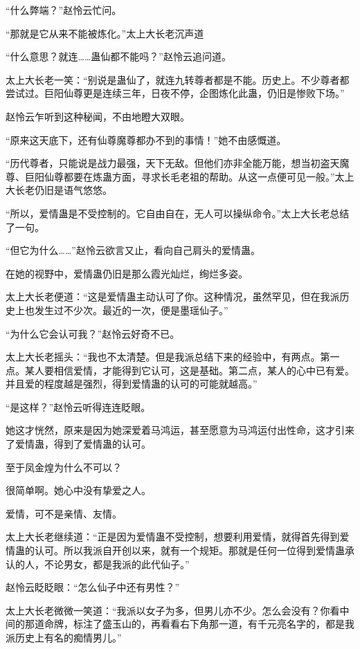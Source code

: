 \begin{this_body}
“什么弊端？”赵怜云忙问。

“那就是它从来不能被炼化。”太上大长老沉声道

“什么意思？就连……蛊仙都不能吗？”赵怜云追问道。

太上大长老一笑：“别说是蛊仙了，就连九转尊者都是不能。历史上。不少尊者都尝试过。巨阳仙尊更是连续三年，日夜不停，企图炼化此蛊，仍旧是惨败下场。”

赵怜云乍听到这种秘闻，不由地瞪大双眼。

“原来这天底下，还有仙尊魔尊都办不到的事情！”她不由感慨道。

“历代尊者，只能说是战力最强，天下无敌。但他们亦非全能万能，想当初盗天魔尊、巨阳仙尊都要在炼蛊方面，寻求长毛老祖的帮助。从这一点便可见一般。”太上大长老仍旧是语气悠悠。

“所以，爱情蛊是不受控制的。它自由自在，无人可以操纵命令。”太上大长老总结了一句。

“但它为什么……”赵怜云欲言又止，看向自己肩头的爱情蛊。

在她的视野中，爱情蛊仍旧是那么霞光灿烂，绚烂多姿。

太上大长老便道：“这是爱情蛊主动认可了你。这种情况，虽然罕见，但在我派历史上也发生过不少次。最近的一次，便是墨瑶仙子。”

“为什么它会认可我？”赵怜云好奇不已。

太上大长老摇头：“我也不太清楚。但是我派总结下来的经验中，有两点。第一点。某人要相信爱情，才能得到它认可，这是基础。第二点，某人的心中已有爱。并且爱的程度越是强烈，得到爱情蛊的认可的可能就越高。”

“是这样？”赵怜云听得连连眨眼。

她这才恍然，原来是因为她深爱着马鸿运，甚至愿意为马鸿运付出性命，这才引来了爱情蛊，得到了爱情蛊的认可。

至于凤金煌为什么不可以？

很简单啊。她心中没有挚爱之人。

爱情，可不是亲情、友情。

太上大长老继续道：“正是因为爱情蛊不受控制，想要利用爱情，就得首先得到爱情蛊的认可。所以我派自开创以来，就有一个规矩。那就是任何一位得到爱情蛊承认的人，不论男女，都是我派的此代仙子。”

赵怜云眨眨眼：“怎么仙子中还有男性？”

太上大长老微微一笑道：“我派以女子为多，但男儿亦不少。怎么会没有？你看中间的那道命牌，标注了盛玉山的，再看看右下角那一道，有千元亮名字的，都是我派历史上有名的痴情男儿。”


\end{this_body}
